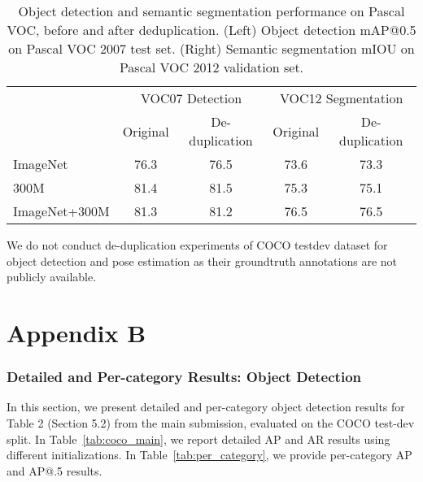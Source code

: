 \begin{table*}[h]
\centering
\renewcommand{\arraystretch}{1.1}
\renewcommand{\tabcolsep}{1.2mm}
\begin{tabular}{@{} l | c  c | c  c @{}}
& \multicolumn{2}{c|}{VOC07 Detection} & \multicolumn{2}{c}{VOC12 Segmentation} \\
& Original & De-duplication & Original & De-duplication \\
\hline
ImageNet & 76.3 & 76.5 & 73.6 & 73.3 \\
300M & 81.4 & 81.5 & 75.3 & 75.1 \\
ImageNet+300M & 81.3 & 81.2 & 76.5 & 76.5 \\
\end{tabular}
\vspace{0.05in}
\caption{Object detection and semantic segmentation performance on Pascal VOC, before and after deduplication. (Left) Object detection mAP@0.5 on Pascal VOC 2007 test set. (Right) Semantic segmentation mIOU on Pascal VOC 2012 validation set.}
\label{tab:pascal_dedup}
\end{table*}

We do not conduct de-duplication experiments of COCO testdev dataset for object detection and pose estimation as their groundtruth annotations are not publicly available.


\clearpage

\section*{Appendix B}

\subsubsection*{Detailed and Per-category Results: Object Detection}
In this section, we present detailed and per-category object detection results for Table 2 (Section 5.2) from the main submission, evaluated on the COCO test-dev split. In Table~\ref{tab:coco_main}, we report detailed AP and AR results using different initializations. In Table~\ref{tab:per_category}, we provide per-category AP and AP@.5 results.  


